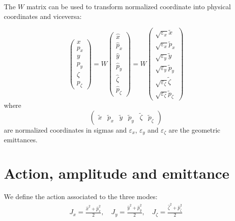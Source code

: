 The $W$ matrix can be used to transform normalized coordinate into physical coordinates and viceversa:

\begin{equation}
\left(\begin{array}{l}
x \\
p_x \\
y \\
p_y \\
\zeta \\
p_\zeta
\end{array}\right)
=
W
\left(\begin{array}{l}
\hat{x} \\
\hat{p}_x \\
\hat{y} \\
\hat{p}_y \\
\hat{\zeta} \\
\hat{p}_\zeta
\end{array}\right)
=
W
\left(\begin{array}{l}
\sqrt{\varepsilon_x} \tilde{x} \\
\sqrt{\varepsilon_x} \tilde{p}_x \\
\sqrt{\varepsilon_y} \tilde{y} \\
\sqrt{\varepsilon_y} \tilde{p}_y \\
\sqrt{\varepsilon_\zeta} \tilde{\zeta} \\
\sqrt{\varepsilon_\zeta} \tilde{p}_\zeta
\end{array}\right)
\label{eq:norm_coord}
\end{equation}
where 
\begin{equation}
\left(\begin{array}{llllll}\tilde{x} & \tilde{p}_x & \tilde{y} & \tilde{p}_y & \tilde{\zeta} & \tilde{p}_\zeta\end{array}\right)
\end{equation}
are normalized coordinates in sigmas and $\varepsilon_x$, $\varepsilon_y$ and $\varepsilon_\zeta$ are the geometric emittances.

\section{Action, amplitude and emittance}

We define the action associated to the three modes:
\begin{align}
J_x = \frac{\hat{x}^2 + \hat{p}^2_x}{2},
\quad
J_y = \frac{\hat{y}^2 + \hat{p}^2_y}{2},
\quad
J_\zeta = \frac{\hat{\zeta}^2 + \hat{p}^2_\zeta}{2}
\label{eq:action}
\end{align}

